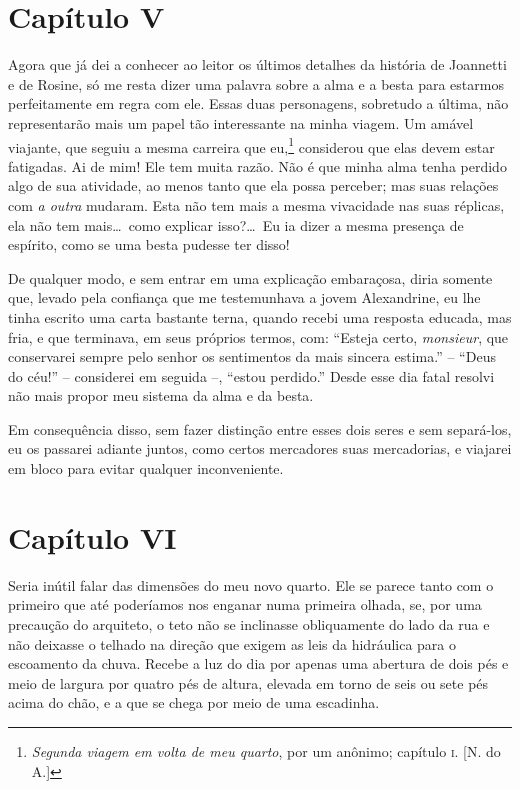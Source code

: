 \section*{Capítulo V}

 Agora que já dei a conhecer ao leitor os últimos detalhes da história
de Joannetti e de Rosine, só me resta dizer uma palavra sobre a alma e
a besta para estarmos perfeitamente em regra com ele. Essas duas
personagens, sobretudo a última, não representarão mais um papel tão
interessante na minha viagem. Um amável viajante, que seguiu a mesma
carreira que eu,\footnote{ \textit{Segunda viagem em volta de meu
quarto}, por um anônimo; capítulo \textsc{i}. [N. do A.]} considerou que elas devem
estar fatigadas. Ai de mim! Ele tem muita razão. Não é que minha alma
tenha perdido algo de sua atividade, ao menos tanto que ela possa
perceber; mas suas relações com \textit{a outra} mudaram. Esta não tem
mais a mesma vivacidade nas suas réplicas, ela não tem mais\ldots\ como
explicar isso?\ldots\ Eu ia dizer a mesma presença de espírito, como se uma
besta pudesse ter disso!

 De qualquer modo, e sem entrar em uma explicação embaraçosa, diria
somente que, levado pela confiança que me testemunhava a jovem
Alexandrine, eu lhe tinha escrito uma carta bastante terna, quando
recebi uma resposta educada, mas fria, e que terminava, em seus
próprios termos, com: ``Esteja certo, \textit{monsieur}, que conservarei
sempre pelo senhor os sentimentos da mais sincera estima.'' -- ``Deus do
céu!'' -- considerei em seguida --, ``estou perdido.'' Desde esse dia fatal
resolvi não mais propor meu sistema da alma e da besta. 

 Em consequência disso, sem fazer distinção entre esses dois seres e sem
separá-los, eu os passarei adiante juntos, como certos mercadores suas
mercadorias, e viajarei em bloco para evitar qualquer inconveniente. 

\section*{Capítulo VI}

 Seria inútil falar das dimensões do meu novo quarto. Ele se parece
tanto com o primeiro que até poderíamos nos enganar numa primeira olhada,                    %
se, por uma precaução do arquiteto, o teto não se inclinasse
obliquamente do lado da rua e não deixasse o telhado na direção que
exigem as leis da hidráulica para o escoamento da chuva. Recebe a luz
do dia por apenas uma abertura de dois pés e meio de largura por quatro
pés de altura, elevada em torno de seis ou sete pés acima do chão, e a
que se chega por meio de uma escadinha.

